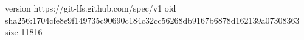 version https://git-lfs.github.com/spec/v1
oid sha256:1704cfe8e9f149735c90690c184c32cc56268db9167b6878d162139a07308363
size 11816
